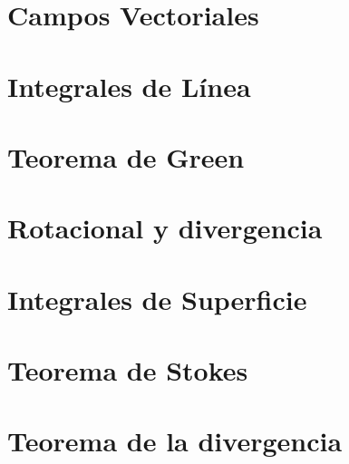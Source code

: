 \documentclass[../main]{subfiles}
\begin{document}
\chapter{Campos Vectoriales}

\chapter{Integrales de Línea}

\chapter{Teorema de Green}

\chapter{Rotacional y divergencia}

\chapter{Integrales de Superficie}

\chapter{Teorema de Stokes}

\chapter{Teorema de la divergencia}
\end{document}

